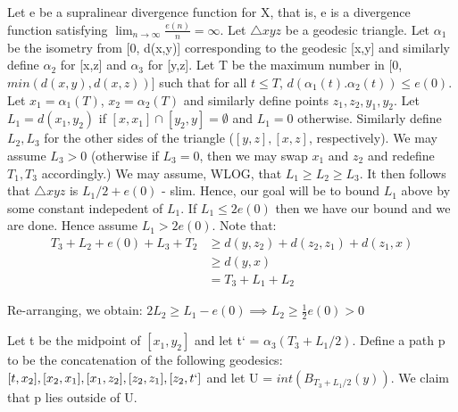 \documentclass[11pt]{article}
\newcommand{\vs}{\vskip10pt}
\begin{document}
 	Let e be a supralinear divergence function for X, that is, e is a divergence function satisfying $\lim_{n \rightarrow \infty} \frac{e(n)}{n} = \infty$. Let $\triangle xyz$ be a geodesic triangle. Let $\alpha_1$ be the isometry from [0, d(x,y)] corresponding to the geodesic [x,y] and similarly define $\alpha_2$ for [x,z] and $\alpha_3$ for [y,z]. Let T be the maximum number in [0, $min(d(x,y), d(x, z))$] such that for all $t \leq T$, $d(\alpha_1(t). \alpha_2(t)) \leq e(0)$. Let $x_1 = \alpha_1(T)$, $x_2 = \alpha_2(T)$ and similarly define points $z_1, z_2, y_1, y_2$. 
 	\vs
 	Let $L_1 = d(x_1, y_2)$ if $[x, x_1] \cap [y_2, y] = \emptyset$ and $L_1 = 0$ otherwise. Similarly define $L_2, L_3$ for the other sides of the triangle ($[y,z],[x,z]$, respectively). We may assume $L_3 > 0$ (otherwise if $L_3 = 0$, then we may swap $x_1$ and $z_2$ and redefine $T_1, T_3$ accordingly.)
 	\vs
 	We may assume, WLOG, that $L_1 \geq L_2 \geq L_3$. It then follows that $\triangle xyz$ is $ L_1/2 + e(0)$ - slim. Hence, our goal will be to bound $L_1$ above by some constant indepedent of $L_1$. 
 	\vs
 	If $L_1 \leq 2e(0)$ then we have our bound and we are done. Hence assume $L_1 > 2e(0)$. Note that:
 	\vs
 	\begin{align*}
 	T_3 + L_2 + e(0) + L_3 + T_2 &\geq d(y, z_2) + d(z_2, z_1) + d(z_1, x) \\
    &\geq d(y, x) \\
    &= T_3 + L_1 + L_2
 	\end{align*}
 	 
 	 Re-arranging, we obtain: $2L_2 \geq L_1 - e(0) \implies L_2 \geq \frac{1}{2} e(0) > 0$
 	 \vs 
 	 
 	 Let t be the midpoint of $[x_1, y_2]$ and let t` = $\alpha_3 (T_3 + L_1/2)$. Define a path p to be the concatenation of the following geodesics: $[t, x_2], [x_2, x_1], [x_1, z_2], [z_2, z_1],[z_2, t`]$ and let U = $int(B_{T_3 + L_1/2}(y))$. We claim that p lies outside of U. 
 	 \vs
 	 
\end{document}
